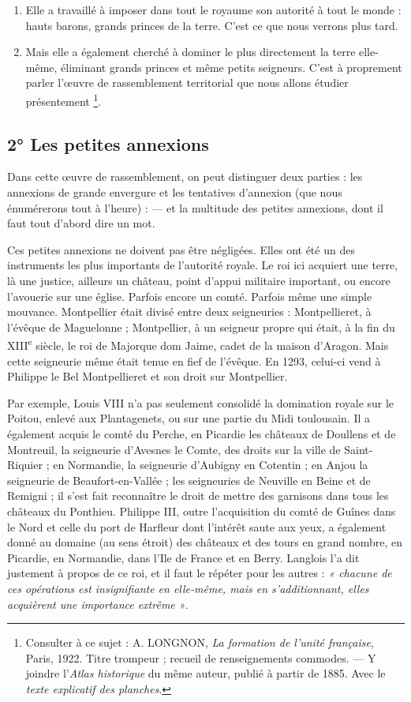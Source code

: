 \documentclass[french,twoside]{book} %
\begin{document}
\begin{enumerate}[itemsep=0pt,]
\item Elle a travaillé à imposer dans tout le royaume son autorité à tout le monde : hauts barons, grands princes de la terre. C’est ce que nous verrons plus tard.
\item Mais elle a également cherché à dominer le plus directement la terre elle-même, éliminant grands princes et même petits seigneurs. C’est à proprement parler l’œuvre de rassemblement territorial que nous allons étudier présentement \footnote{ Consulter à ce sujet : A. LONGNON, {\itshape La formation de l’unité française}, Paris, 1922. Titre trompeur ; recueil de renseignements commodes. — Y joindre l’{\itshape Atlas historique} du même auteur, publié à partir de 1885. Avec le \emph{texte explicatif des planches}.}.

\end{enumerate}\subsection[2° Les petites annexions]{2° Les petites annexions}
\label{c03c2}
\noindent Dans cette œuvre de rassemblement, on peut distinguer deux parties : les annexions de grande envergure et les tentatives d’annexion (que nous énumérerons tout à l’heure) : — et la multitude des petites annexions, dont il faut tout d’abord dire un mot.\par
Ces petites annexions ne doivent pas être négligées. Elles ont été un des instruments les plus importants de l’autorité royale. Le roi ici acquiert une terre, là une justice, ailleurs un château, point d’appui militaire important, ou encore l’avouerie sur une église. Parfois encore un comté. Parfois même une simple mouvance. Montpellier était divisé entre deux seigneuries : Montpellieret, à l’évêque de Maguelonne ; Montpellier, à un seigneur propre qui était, à la fin du XIII\textsuperscript{e} siècle, le roi de Majorque dom Jaime, cadet de la maison d’Aragon. Mais cette seigneurie même était tenue en fief de l’évêque. En 1293, celui-ci vend à Philippe le Bel Montpellieret et son droit sur Montpellier.\par
Par exemple, Louis VIII n’a pas seulement consolidé la domination royale sur le Poitou, enlevé aux Plantagenets, ou sur une partie du Midi toulousain. Il a également acquis le comté du Perche, en Picardie les châteaux de Doullens et de Montreuil, la seigneurie  
\label{p20} d’Avesnes le Comte, des droits sur la ville de Saint-Riquier ; en Normandie, la seigneurie d’Aubigny en Cotentin ; en Anjou la seigneurie de Beaufort-en-Vallée ; les seigneuries de Neuville en Beine et de Remigni ; il s’est fait reconnaître le droit de mettre des garnisons dans tous les châteaux du Ponthieu. Philippe III, outre l’acquisition du comté de Guînes dans le Nord et celle du port de Harfleur dont l’intérêt saute aux yeux, a également donné au domaine (au sens étroit) des châteaux et des tours en grand nombre, en Picardie, en Normandie, dans l’Ile de France et en Berry. Langlois l’a dit justement à propos de ce roi, et il faut le répéter pour les autres : \emph{« chacune de ces opérations est insignifiante en elle-même, mais en s’additionnant, elles acquièrent une importance extrême »}.\par
\end{document}
